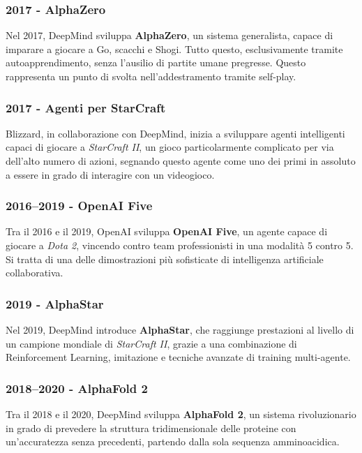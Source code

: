 \subsubsection{2017 - AlphaZero}

Nel 2017, DeepMind sviluppa \textbf{AlphaZero}, un sistema generalista, capace di imparare a giocare a Go, scacchi e Shogi. Tutto questo, esclusivamente tramite autoapprendimento, senza l’ausilio di partite umane pregresse. Questo rappresenta un punto di svolta nell’addestramento tramite self-play.

\subsubsection{2017 - Agenti per StarCraft}

Blizzard, in collaborazione con DeepMind, inizia a sviluppare agenti intelligenti capaci di giocare a \textit{StarCraft II}, un gioco particolarmente complicato per via dell’alto numero di azioni, segnando questo agente come uno dei primi in assoluto a essere in grado di interagire con un videogioco.

\subsubsection{2016–2019 - OpenAI Five}

Tra il 2016 e il 2019, OpenAI sviluppa \textbf{OpenAI Five}, un agente capace di giocare a \textit{Dota 2}, vincendo contro team professionisti in una modalità 5 contro 5. Si tratta di una delle dimostrazioni più sofisticate di intelligenza artificiale collaborativa.

\subsubsection{2019 - AlphaStar}

Nel 2019, DeepMind introduce \textbf{AlphaStar}, che raggiunge prestazioni al livello di un campione mondiale di \textit{StarCraft II}, grazie a una combinazione di Reinforcement Learning, imitazione e tecniche avanzate di training multi-agente.

\subsubsection{2018–2020 - AlphaFold 2}

Tra il 2018 e il 2020, DeepMind sviluppa \textbf{AlphaFold 2}, un sistema rivoluzionario in grado di prevedere la struttura tridimensionale delle proteine con un'accuratezza senza precedenti, partendo dalla sola sequenza amminoacidica.


